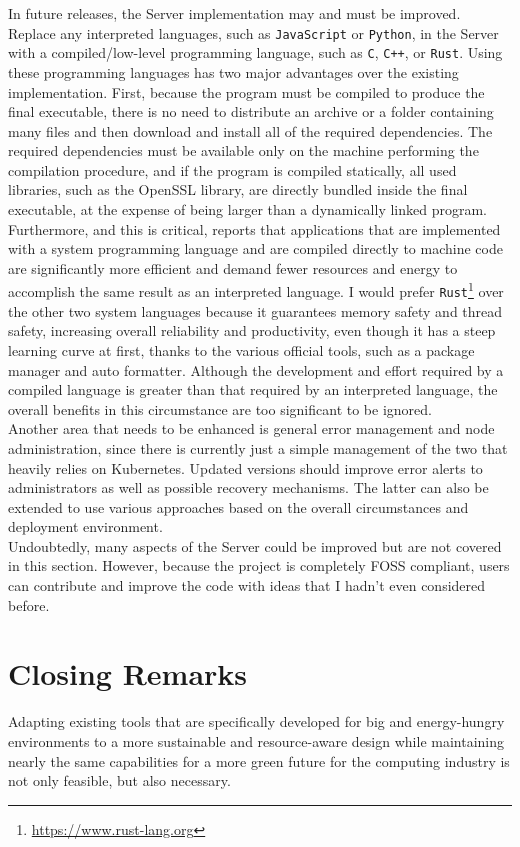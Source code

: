 In future releases, the Server implementation may and must be improved. \\ %
Replace any interpreted languages, such as \texttt{JavaScript} or \texttt{Python},
in the Server with a compiled/low-level programming language, such as \texttt{C},
\texttt{C++}, or \texttt{Rust}. Using these programming languages has two major advantages
over the existing implementation. First, because the program must be compiled to
produce the final executable, there is no need to distribute an archive or a
folder containing many files and then download and install all of the required
dependencies. The required dependencies must be available only on the machine performing
the compilation procedure, and if the program is compiled statically, all used libraries,
such as the OpenSSL library, are directly bundled inside the final executable,
at the expense of being larger than a dynamically linked program. Furthermore,
and this is critical, \cite{programming_languages_efficiency} reports that applications
that are implemented with a system programming language and are compiled directly
to machine code are significantly more efficient and demand fewer resources and energy
to accomplish the same result as an interpreted language. I would prefer \texttt{Rust}\footnote{\url{https://www.rust-lang.org}}
over the other two system languages because it guarantees memory safety and thread
safety, increasing overall reliability and productivity, even though it has a steep
learning curve at first, thanks to the various official tools, such as a package
manager and auto formatter. Although the development and effort required by a
compiled language is greater than that required by an interpreted language, the overall
benefits in this circumstance are too significant to be ignored. \\ %
Another area that needs to be enhanced is general error management and node administration,
since there is currently just a simple management of the two that heavily relies
on Kubernetes. Updated versions should improve error alerts to administrators as
well as possible recovery mechanisms. The latter can also be extended to use
various approaches based on the overall circumstances and deployment environment.
\\ %
Undoubtedly, many aspects of the Server could be improved but are not covered in
this section. However, because the project is completely FOSS compliant, users
can contribute and improve the code with ideas that I hadn't even considered
before.

\section{Closing Remarks}
\label{sec:conclusions_closing_remarks}

Adapting existing tools that are specifically developed for big and energy-hungry
environments to a more sustainable and resource-aware design while maintaining nearly
the same capabilities for a more green future for the computing industry is not only
feasible, but also necessary.